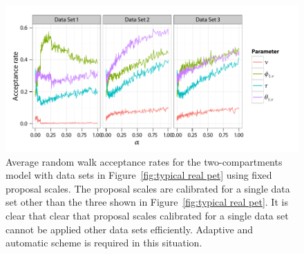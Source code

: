 \begin{figure}[t]
  \UseAltLinespread
  \includegraphics[width=\linewidth]{fig_src/Fixed_Proposal}
  \caption[Acceptance rates of non-adaptive \protect\smc algorithms]
  {Average random walk acceptance rates for the two-compartments \pet model with data sets in Figure~\ref{fig:typical real pet} using fixed proposal scales. The proposal scales are calibrated for a single data set other than the three shown in Figure~\ref{fig:typical real pet}. It is clear that clear that proposal scales calibrated for a single data set cannot be applied other data sets efficiently. Adaptive and automatic scheme is required in this situation.}
  \label{fig:pet fixed proposal}
\end{figure}
